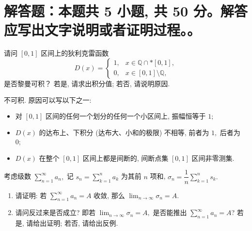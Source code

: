 \showquestionpoints
\section{解答题：本题共 5 小题, 共 50 分。解答应写出文字说明或者证明过程。。}


\begin{question}[points = 8]
请问 $[0, 1]$ 区间上的狄利克雷函数
\begin{equation*}
D(x) = \begin{cases} 1, & x \in \mathbb{Q} \cap* [0, 1], \\ 0, & x \in [0, 1] \setminus \mathbb{Q}, \end{cases}
\end{equation*}
是否黎曼可积？ 若是, 请求出积分值; 若否, 请说明原因.

\end{question}

\begin{solution}
不可积. 原因可以写以下之一:
\begin{itemize}
\item[\ding{43}] 对 $[0, 1]$ 区间的任何一个划分的任何一个小区间上, 振幅恒等于 $1;$
\item[\ding{43}] $D(x)$ 的达布上、下积分 (达布大、小和的极限) 不相等, 前者为 $1,$ 后者为 $0;$
\item[\ding{43}] $D(x)$ 在整个 $[0, 1]$ 区间上都是间断的, 间断点集 $[0, 1]$ 区间非零测集.
\end{itemize}
\end{solution}

\begin{question}[points = 10]
考虑级数 $\displaystyle \sum_{n=1}^{\infty} a_n,$ 记 $\displaystyle s_n = \sum_{k=1}^{n} a_k$ 为其前 $n$ 项和, $\displaystyle \sigma_n = \dfrac{1}{n} \sum_{k=1}^{n} s_k.$
\begin{enumerate}
\item 请证明: 若 $\displaystyle \sum_{n=1}^{\infty} a_n = A$ 收敛, 那么 $\displaystyle \lim_{n\to\infty} \sigma_n = A.$
\item 请问反过来是否成立? 即若 $\displaystyle \lim_{n\to\infty} \sigma_n = A,$ 是否能推出 $\displaystyle \sum_{n=1}^{\infty} a_n = A$? 若是, 请给出证明; 若否, 请给出反例.
\end{enumerate}

\end{question}

